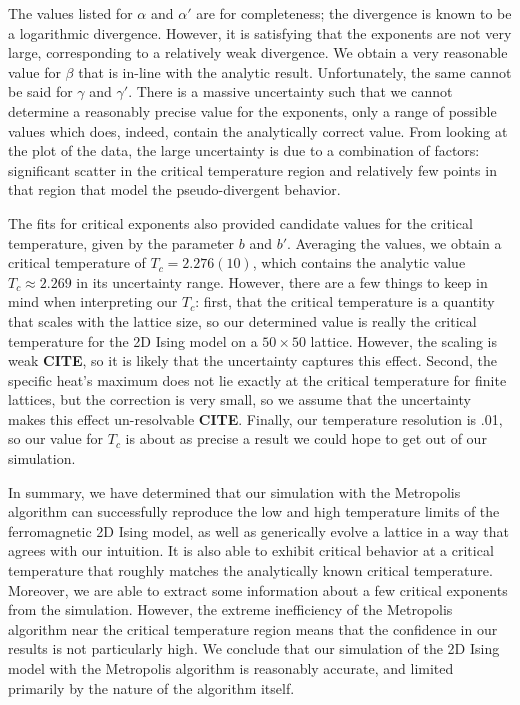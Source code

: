 \documentclass[twocolumn,aps,prl]{revtex4-1} %
\begin{document}
The values listed for $\alpha$ and $\alpha'$ are for completeness; the divergence is known to be a logarithmic divergence. However, it is satisfying that the exponents are not very large, corresponding to a relatively weak divergence. We obtain a very reasonable value for $\beta$ that is in-line with the analytic result. Unfortunately, the same cannot be said for $\gamma$ and $\gamma'$. There is a massive uncertainty such that we cannot determine a reasonably precise value for the exponents, only a range of possible values which does, indeed, contain the analytically correct value. From looking at the plot of the data, the large uncertainty is due to a combination of factors: significant scatter in the critical temperature region and relatively few points in that region that model the pseudo-divergent behavior. 

The fits for critical exponents also provided candidate values for the critical temperature, given by the parameter $b$ and $b'$. Averaging the values, we obtain a critical temperature of $T_c = 2.276(10)$, which contains the analytic value $T_c \approx 2.269$ in its uncertainty range. However, there are a few things to keep in mind when interpreting our $T_c$: first, that the critical temperature is a quantity that scales with the lattice size, so our determined value is really the critical temperature for the 2D Ising model on a $50 \times 50$ lattice. However, the scaling is weak \textbf{CITE}, so it is likely that the uncertainty captures this effect. Second, the specific heat's maximum does not lie exactly at the critical temperature for finite lattices, but the correction is very small, so we assume that the uncertainty makes this effect un-resolvable \textbf{CITE}. Finally, our temperature resolution is .01, so our value for $T_c$ is about as precise a result we could hope to get out of our simulation.

In summary, we have determined that our simulation with the Metropolis algorithm can successfully reproduce the low and high temperature limits of the ferromagnetic 2D Ising model, as well as generically evolve a lattice in a way that agrees with our intuition. It is also able to exhibit critical behavior at a critical temperature that roughly matches the analytically known critical temperature. Moreover, we are able to extract some information about a few critical exponents from the simulation. However, the extreme inefficiency of the Metropolis algorithm near the critical temperature region means that the confidence in our results is not particularly high. We conclude that our simulation of the 2D Ising model with the Metropolis algorithm is reasonably accurate, and limited primarily by the nature of the algorithm itself.
\end{document}
